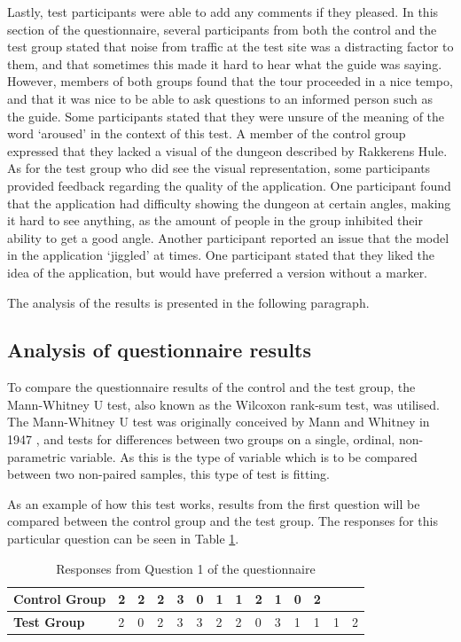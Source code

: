 Lastly, test participants were able to add any comments if they pleased. In this section of the questionnaire, several participants from both the control and the test group stated that noise from traffic at the test site was a distracting factor to them, and that sometimes this made it hard to hear what the guide was saying. However, members of both groups found that the tour proceeded in a nice tempo, and that it was nice to be able to ask questions to an informed person such as the guide. Some participants stated that they were unsure of the meaning of the word ‘aroused’ in the context of this test. A member of the control group expressed that they lacked a visual of the dungeon described by Rakkerens Hule. As for the test group who did see the visual representation, some participants provided feedback regarding the quality of the application. One participant found that the application had difficulty showing the dungeon at certain angles, making it hard to see anything, as the amount of people in the group inhibited their ability to get a good angle. Another participant reported an issue that the model in the application ‘jiggled’ at times. One participant stated that they liked the idea of the application, but would have preferred a version without a marker.
 
The analysis of the results is presented in the following paragraph.

\subsection{Analysis of questionnaire results}\label{sec:questionnaire_analysis}
To compare the questionnaire results of the control and the test group, the Mann-Whitney U test, also known as the Wilcoxon rank-sum test, was utilised. The Mann-Whitney U test was originally conceived by Mann and Whitney in 1947 \cite{Mann1947}, and tests for differences between two groups on a single, ordinal, non-parametric variable. As this is the type of variable which is to be compared between two non-paired samples, this type of test is fitting.

As an example of how this test works, results from the first question will be compared between the control group and the test group. The responses for this particular question can be seen in Table \ref{table:question_1}.

\begin{table}[h!]\centering
\begin{tabular}{| p{1.5cm} | p{0.2cm} | p{0.2cm} | p{0.2cm} | p{0.2cm} | p{0.2cm} | p{0.2cm} | p{0.2cm} | p{0.2cm} | p{0.2cm} | p{0.2cm} | p{0.2cm} | p{0.2cm} | p{0.2cm} |}\hline
\textbf{Control Group} & 2 & 2 & 2 & 3 & 0 & 1 & 1 & 2 & 1 & 0 & 2 &  &  \\ \hline
\textbf{Test Group} & 2 & 0 & 2 & 3 & 3 & 2 & 2 & 0 & 3 & 1 & 1 & 1 &2 \\ \hline
\end{tabular}
\caption{Responses from Question 1 of the questionnaire \label{table:question_1}}
\end{table}

